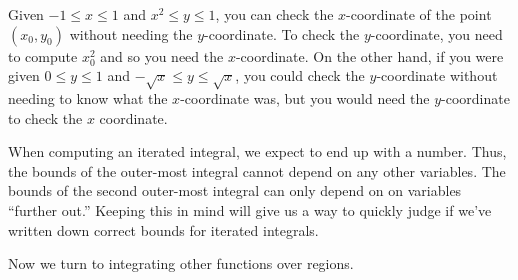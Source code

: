 Given $-1\leq x\leq 1$ and $x^2\leq y\leq 1$, you can check the $x$-coordinate of the
point $(x_0,y_0)$ without needing the $y$-coordinate.  To check the $y$-coordinate, you 
need to compute $x_0^2$ and so you need the $x$-coordinate.  On the other hand, if you
were given $0\leq y\leq 1$
and $-\sqrt{x}\leq y\leq \sqrt{x}$, you could check the $y$-coordinate without needing
to know what the $x$-coordinate was, but you would need the $y$-coordinate to check the $x$ coordinate.

When computing an iterated integral, we expect to end up with a number.  Thus, the bounds
of the outer-most integral cannot depend on any other variables.  The bounds of the second
outer-most integral can only depend on on variables ``further out.''  Keeping this in mind
will give us a way to quickly judge if we've written down correct bounds for iterated integrals.

Now we turn to integrating other functions over regions.

